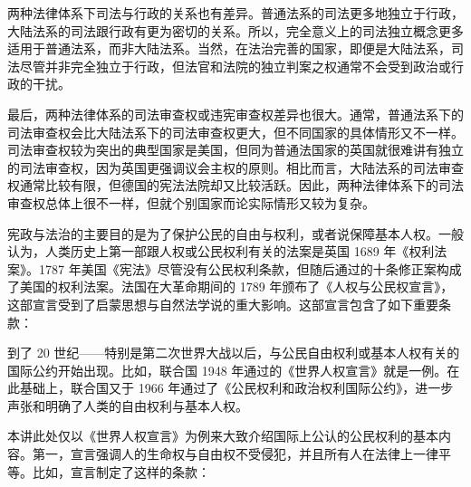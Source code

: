 两种法律体系下司法与行政的关系也有差异。普通法系的司法更多地独立于行政，大陆法系的司法跟行政有更为密切的关系。所以，完全意义上的司法独立概念更多适用于普通法系，而非大陆法系。当然，在法治完善的国家，即便是大陆法系，司法尽管并非完全独立于行政，但法官和法院的独立判案之权通常不会受到政治或行政的干扰。

最后，两种法律体系的司法审查权或违宪审查权差异也很大。通常，普通法系下的司法审查权会比大陆法系下的司法审查权更大，但不同国家的具体情形又不一样。司法审查权较为突出的典型国家是美国，但同为普通法国家的英国就很难讲有独立的司法审查权，因为英国更强调议会主权的原则。相比而言，大陆法系的司法审查权通常比较有限，但德国的宪法法院却又比较活跃。因此，两种法律体系下的司法审查权总体上很不一样，但就个别国家而论实际情形又较为复杂。


宪政与法治的主要目的是为了保护公民的自由与权利，或者说保障基本人权。一般认为，人类历史上第一部跟人权或公民权利有关的法案是英国 1689 年《权利法案》。1787 年美国《宪法》尽管没有公民权利条款，但随后通过的十条修正案构成了美国的权利法案。法国在大革命期间的 1789 年颁布了《人权与公民权宣言》，这部宣言受到了启蒙思想与自然法学说的重大影响。这部宣言包含了如下重要条款：


到了 20 世纪——特别是第二次世界大战以后，与公民自由权利或基本人权有关的国际公约开始出现。比如，联合国 1948 年通过的《世界人权宣言》就是一例。在此基础上，联合国又于 1966 年通过了《公民权利和政治权利国际公约》，进一步声张和明确了人类的自由权利与基本人权。

本讲此处仅以《世界人权宣言》为例来大致介绍国际上公认的公民权利的基本内容。第一，宣言强调人的生命权与自由权不受侵犯，并且所有人在法律上一律平等。比如，宣言制定了这样的条款：

